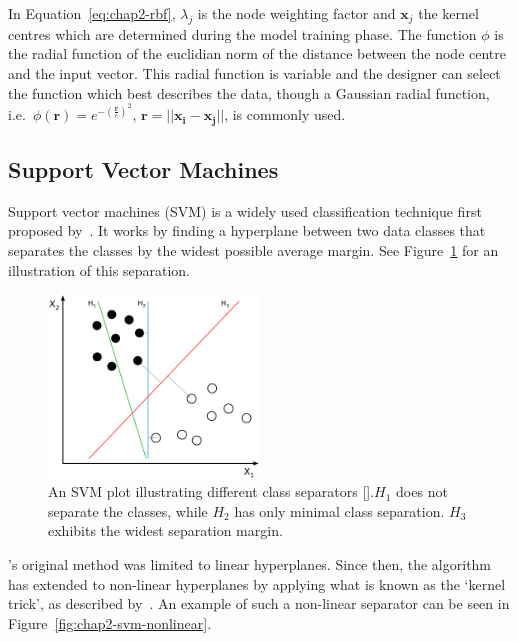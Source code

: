 In Equation~\ref{eq:chap2-rbf}, $\lambda_j$ is the node weighting factor and $\bm{x}_j$ the kernel centres which are determined during the model training phase. The function $\phi$ is the radial function of the euclidian norm of the distance between the node centre and the input vector. This radial function is variable and the designer can select the function which best describes the data, though a Gaussian radial function, i.e.\ $\phi(\bm{r}) = e^{-(\frac{\bm{r}}{\epsilon})^2}$, $\bm{r} = || \bm{x_i} - \bm{x_j} ||$, is commonly used.  

\subsection{Support Vector Machines}

Support vector machines (SVM) is a widely used classification technique first proposed by~\cite{vapnik1995support}. It works by finding a hyperplane between two data classes that separates the classes by the widest possible average margin. See Figure~\ref{fig:chap2-svm-linear} for an illustration of this separation.

\begin{figure}
  \centering
  \includegraphics[width=0.5\textwidth]{figures/chapter2/svm_linear}
  \caption[SVM with linear hyperplane.]{An SVM plot illustrating different class separators [\cite{svm-wiki-pic}].\@$H_1$ does not separate the classes, while $H_2$ has only minimal class separation. $H_3$ exhibits the widest separation margin.}
\label{fig:chap2-svm-linear}
\end{figure}

\citeauthor{vapnik1995support}'s original method was limited to linear hyperplanes. Since then, the algorithm has extended to non-linear hyperplanes by applying what is known as the `kernel trick', as described by~\cite{amari1999improving}. An example of such a non-linear separator can be seen in Figure~\ref{fig:chap2-svm-nonlinear}.

